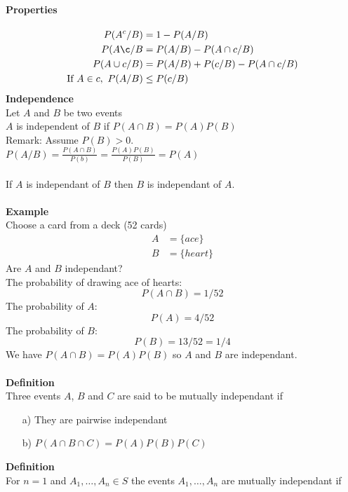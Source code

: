 \documentclass[12pt,a4paper,draft]{report}
\begin{document}
\paragraph{Properties}
\begin{align}
P(A^c/B)&=1-P(A/B)\\
P(A\c/B&=P(A/B)-P(A\cap c/B)\\
P(A\cup c/B)&=P(A/B)+P(c/B)-P(A\cap c/B)\\
\text{If }A\in c, \ P(A/B)&\leq P(c/B)
\end{align}
\textbf{Independence}\\
Let $A$ and $B$ be two events\\
$A$ is independent of $B$ if $P(A\cap B)=P(A)P(B)$\\
Remark: Assume $P(B)>0$.\\
$P(A/B)=\frac{P(A\cap B)}{P(b)}=\frac{P(A)P(B)}{P(B)}=P(A)$\\\\
If $A$ is independant of $B$ then $B$ is independant of $A$.\\\\
\textbf{Example}\\
Choose a card from a deck (52 cards)
\begin{align}
A&=\{ace\}\\
B&=\{heart\}
\end{align}
Are $A$ and $B$ independant?\\
The probability of drawing ace of hearts:
\begin{equation}
P(A\cap B)=1/52
\end{equation}
The probability of $A$:
\begin{equation}
P(A)=4/52
\end{equation}
The probability of $B$:
\begin{equation}
P(B)=13/52=1/4
\end{equation}
We have $P(A\cap B)=P(A)P(B)$ so $A$ and $B$ are independant.\\\\
\textbf{Definition}\\
Three events $A$, $B$ and $C$ are said to be mutually independant if
\begin{itemize}
\setlength\itemsep{0em}
\item[a)] They are pairwise independant
\item[b)] $P(A\cap B\cap C)=P(A)P(B)P(C)$
\end{itemize}
\textbf{Definition}\\
For $n=1$ and $A_1,\hdots ,A_n\in S$ the events $A_1,\hdots ,A_n$ are mutually independant if 
\end{document}
